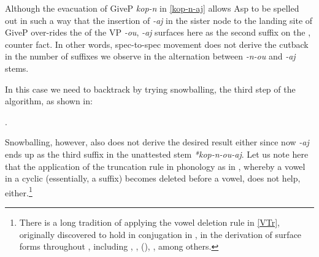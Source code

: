 Although the evacuation of GiveP \textit{kop-n} in \ref{kop-n-aj} allows Asp to be spelled out in such a way that the insertion of \textit{-aj} in the sister node to the landing site of  GiveP over-rides the  of the VP \textit{-ou}, \textit{-aj} surfaces here as the second suffix on the , counter fact. In other words, spec-to-spec movement does not derive the cutback in the number of suffixes we observe in the alternation between  \textit{-n-ou} and  \textit{-aj} stems. 
\par
In this case we need to backtrack  by trying snowballing, the third step of the algorithm, as shown in: 

\ex.\label{kop-n-ou-aj}

\largerpage[-3]
Snowballing, however, also does not derive the desired result either since now \textit{-aj} ends up as the third suffix in the unattested stem \textit{*kop-n-ou-aj}.
Let us note here that the application of the truncation rule in  phonology as in \Next, whereby a vowel in a cyclic  (essentially, a suffix) becomes deleted before a vowel, does not help, either.\footnote{There is a long tradition of applying the vowel deletion  rule in \ref{VTr}, originally discovered to hold in  conjugation in \cite{Jakobson1948}, in the derivation of surface forms throughout , including \cite{Lightner1972}, \cite{Guss1980}, \citeauthor{Rubach1984} (\citeyear{Rubach1984,Rubach1993}), \cite{NH2009}, among others.
} %

